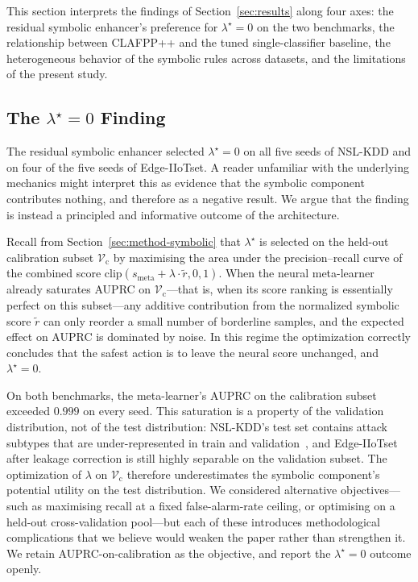 \documentclass[pdflatex,sn-mathphys-num]{sn-jnl}
\theoremstyle{thmstyleone}
\theoremstyle{thmstyletwo}
\theoremstyle{thmstylethree}
\begin{document}
This section interprets the findings of Section~\ref{sec:results} along four axes: the residual symbolic enhancer's preference for $\lambda^{\star} = 0$ on the two benchmarks, the relationship between CLAFPP++ and the tuned single-classifier baseline, the heterogeneous behavior of the symbolic rules across datasets, and the limitations of the present study.

\subsection{The $\lambda^{\star} = 0$ Finding}\label{sec:disc-lambda}

The residual symbolic enhancer selected $\lambda^{\star} = 0$ on all five seeds of NSL-KDD and on four of the five seeds of Edge-IIoTset. A reader unfamiliar with the underlying mechanics might interpret this as evidence that the symbolic component contributes nothing, and therefore as a negative result. We argue that the finding is instead a principled and informative outcome of the architecture.

Recall from Section~\ref{sec:method-symbolic} that $\lambda^{\star}$ is selected on the held-out calibration subset $\mathcal{V}_{\mathrm{c}}$ by maximising the area under the precision--recall curve of the combined score $\mathrm{clip}(s_{\mathrm{meta}} + \lambda \cdot \tilde{r}, 0, 1)$. When the neural meta-learner already saturates AUPRC on $\mathcal{V}_{\mathrm{c}}$---that is, when its score ranking is essentially perfect on this subset---any additive contribution from the normalized symbolic score $\tilde{r}$ can only reorder a small number of borderline samples, and the expected effect on AUPRC is dominated by noise. In this regime the optimization correctly concludes that the safest action is to leave the neural score unchanged, and $\lambda^{\star} = 0$.

On both benchmarks, the meta-learner's AUPRC on the calibration subset exceeded $0.999$ on every seed. This saturation is a property of the validation distribution, not of the test distribution: NSL-KDD's test set contains attack subtypes that are under-represented in train and validation~\cite{tavallaee2009detailed}, and Edge-IIoTset after leakage correction is still highly separable on the validation subset. The optimization of $\lambda$ on $\mathcal{V}_{\mathrm{c}}$ therefore underestimates the symbolic component's potential utility on the test distribution. We considered alternative objectives---such as maximising recall at a fixed false-alarm-rate ceiling, or optimising on a held-out cross-validation pool---but each of these introduces methodological complications that we believe would weaken the paper rather than strengthen it. We retain AUPRC-on-calibration as the objective, and report the $\lambda^{\star} = 0$ outcome openly.
\end{document}
